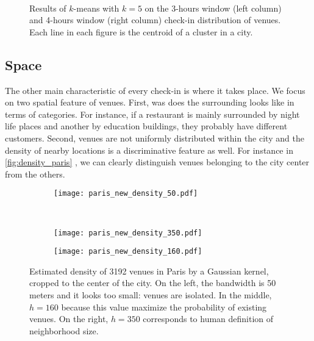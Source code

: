 \begin{figure}[p]
    \begin{subfigure}[b]{0.35\textwidth}
    \centering
    \iftoggle{EXTERNALPGF}{\texttt{[image: cluster\_day\_3h\_cl5]}}{}
    \end{subfigure}~
    \begin{subfigure}[b]{0.35\textwidth}
    \centering
    \iftoggle{EXTERNALPGF}{\texttt{[image: cluster\_day\_4h\_cl5]}}{}
    \end{subfigure}
    \caption[Venues cluster by time among all the cities]{
		Results of $k$-means with $k=5$ on the 3-hours window (left column) and 4-hours window (right column) check-in distribution of venues. 
Each line in each figure is the centroid of a cluster in a city.\label{fig:time_cluster_size}}
\end{figure}
\clearpage
\restoregeometry

\subsection{Space}

The other main characteristic of every check-in is where it takes place. We
focus on two spatial feature of venues. First, was does the surrounding looks
like in terms of categories. For instance, if a restaurant is mainly
surrounded by night life places and another by education buildings, they
probably have different customers. Second, venues are not uniformly
distributed within the city and the density of nearby locations is a
discriminative feature as well. For instance in \autoref{fig:density_paris}
, we can clearly distinguish venues belonging to
the city center from the others.

\begin{figure}[h]
        \centering
    \begin{subfigure}[b]{0.25\textheight}
        \centering
        \texttt{[image: paris\_new\_density\_50.pdf]}
    \end{subfigure}~
    \begin{subfigure}[b]{0.25\textheight}
	\texttt{[image: paris\_new\_density\_350.pdf]}
    \end{subfigure}
    \begin{subfigure}[b]{0.25\textheight}
        \centering
	\texttt{[image: paris\_new\_density\_160.pdf]}
    \end{subfigure}
\caption[Venue density in Paris]{Estimated density of 3192 venues in Paris by
	a Gaussian kernel, cropped to the center of the city. On the left, the
	bandwidth is 50 meters and it looks too small: venues are isolated. In
	the middle, $h=160$ because this value maximize the probability of
	existing venues. On the right, $h=350$ corresponds to human
definition of neighborhood size.\label{fig:density_paris}}
\end{figure}

